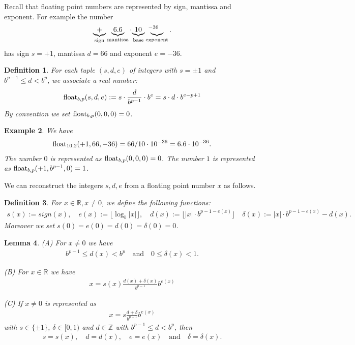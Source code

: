 \documentclass{article}
\theoremstyle{plain}
\newtheorem{definition}{Definition}[section]
\newtheorem{example}[definition]{Example}
\newtheorem{lemma}[definition]{Lemma}
\newcommand{\IR}{\mathbb{R}}
\newcommand{\IZ}{\mathbb{Z}}
\newcommand{\qtext}[1]{\quad\text{#1}\quad} %
\newcommand{\floor}[1]{\lfloor#1\rfloor}
\newcommand{\abs}[1]{|#1|}
\begin{document}
Recall that floating point numbers are represented by sign, mantissa and exponent.
For example the number
\begin{align*}
  \underbrace{+}_{\text{sign}} \underbrace{6.6}_{\text{mantissa}} \cdot {\underbrace{10}_{\text{base}}\hspace{.5em}}^{-36} \hspace{-2em}\underbrace{\hspace{.5em}}_{\text{exponent}}.
\end{align*}
has sign $s=+1$, mantissa $d=66$ and exponent $e=-36$.

\begin{definition}
  For each tuple $(s,d,e)$ of integers with $s=\pm1$ and $b^{p-1} \leq d < b^p$, we associate a real number:
  \begin{align*}
    \mathrm{float}_{b,p}(s,d,e) := s \cdot \frac{d}{b^{p-1}} \cdot b^e = s \cdot d \cdot b^{e-p+1}
  \end{align*}
  By convention we set $\mathrm{float}_{b,p}(0,0,0)=0$.
\end{definition}

\begin{example}
  We have
  \begin{align*}
    \mathrm{float}_{10,2}(+1,66,-36) = 66/10 \cdot 10^{-36}  = 6.6 \cdot 10^{-36}.
  \end{align*}
  The number $0$ is represented as $\mathrm{float}_{b,p}(0,0,0) = 0$.
  The number $1$ is represented as $\mathrm{float}_{b,p}(+1,b^{p-1},0) = 1$.
\end{example}

We can reconstruct the integers $s,d,e$ from a floating point number $x$ as follows.
\begin{definition}
  For $x\in\IR, x\neq 0$, we define the following functions:
  \begin{align*}
    s(x) := sign(x), \quad
    e(x) := \floor{\log_b\abs{x}}, \quad
    d(x) := \floor{\abs{x} \cdot b^{p-1-e(x)}} \quad
    \delta(x) := \abs{x} \cdot b^{p-1-e(x)} - d(x).
  \end{align*}
  Moreover we set $s(0) = e(0) = d(0) = \delta(0) = 0$.
\end{definition}

\begin{lemma} \label{floatlem}
  (A) For $x \neq 0$ we have
  \begin{align*}
    b^{p-1} \leq d(x) < b^p \qtext{and} 0 \leq \delta(x) < 1.
  \end{align*}

  (B) For $x \in \IR$ we have
  \begin{align*}
    x = s(x) \frac{d(x) + \delta(x)}{b^{p-1}} b^{e(x)}
  \end{align*}

  (C) If $x \neq 0$ is represented as
  \begin{align*}
    x = s \frac{d + \delta}{b^{p-1}} b^{e(x)}
  \end{align*}
  with $s \in \{\pm 1\}$, $\delta \in [0,1)$ and $d \in \IZ$ with $b^{p-1} \leq d < b^p$, then
  \begin{align*}
    s = s(x), \quad d = d(x), \quad e = e(x) \qtext{and} \delta = \delta(x).
  \end{align*}
\end{lemma}
\end{document}
